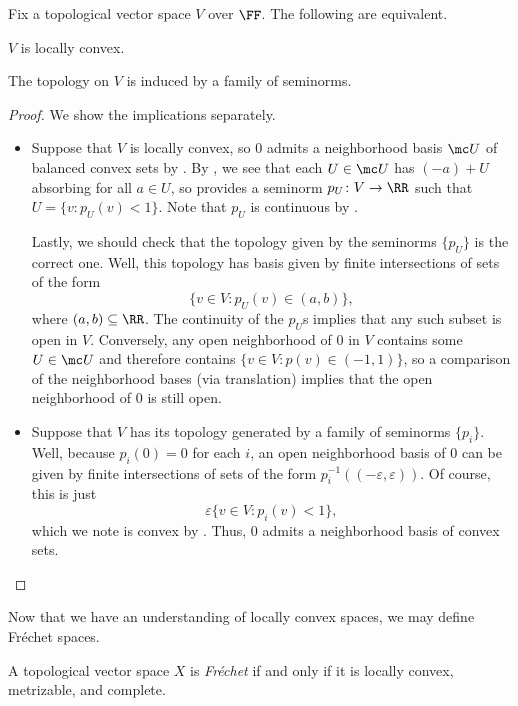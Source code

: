 \documentclass[notes.tex]{subfiles}
\begin{document}
\begin{corollary} \label{cor:locally-convex-by-seminorm}
	Fix a topological vector space $V$ over $\FF$. The following are equivalent.
	\begin{listroman}
		\item $V$ is locally convex.
		\item The topology on $V$ is induced by a family of seminorms.
	\end{listroman}
\end{corollary}
\begin{proof}
	We show the implications separately.
	\begin{itemize}
		\item Suppose that $V$ is locally convex, so $0$ admits a neighborhood basis $\mc U$ of balanced convex sets by . By , we see that each $U\in\mc U$ has $(-a)+U$ absorbing for all $a\in U$, so  provides a seminorm $p_U\colon V\to\RR$ such that $U=\{v:p_U(v)<1\}$. Note that $p_U$ is continuous by .

		Lastly, we should check that the topology given by the seminorms $\{p_U\}$ is the correct one. Well, this topology has basis given by finite intersections of sets of the form
		\[\{v\in V:p_U(v)\in(a,b)\},\]
		where $(a,b)\subseteq\RR$. The continuity of the $p_U$s implies that any such subset is open in $V$. Conversely, any open neighborhood of $0$ in $V$ contains some $U\in\mc U$ and therefore contains $\{v\in V:p(v)\in(-1,1)\}$, so a comparison of the neighborhood bases (via translation) implies that the open neighborhood of $0$ is still open.

		\item Suppose that $V$ has its topology generated by a family of seminorms $\{p_i\}$. Well, because $p_i(0)=0$ for each $i$, an open neighborhood basis of $0$ can be given by finite intersections of sets of the form $p_i^{-1}((-\varepsilon,\varepsilon))$. Of course, this is just
		\[\varepsilon\{v\in V:p_i(v)<1\},\]
		which we note is convex by . Thus, $0$ admits a neighborhood basis of convex sets.
		\qedhere
	\end{itemize}
\end{proof}
Now that we have an understanding of locally convex spaces, we may define Fr\'echet spaces.
\begin{definition}[Fr\'echet]
	A topological vector space $X$ is \textit{Fr\'echet} if and only if it is locally convex, metr\-izable, and complete.
\end{definition}
\end{document}
